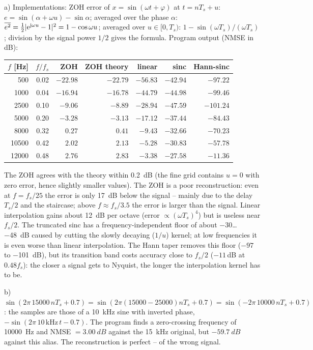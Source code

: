 \begin{solution}
a) Implementations:
ZOH error of $x=\sin(\omega t+\varphi)$ at $t=nT_s+u$:
$e=\sin(\alpha+\omega u)-\sin\alpha$; averaged over the phase
$\alpha$: $\overline{e^2}=\tfrac12|\mathrm{e}^{\mathrm{j}\omega u}-1|^2=1-\cos\omega u$;
averaged over $u\in[0,T_s)$: $1-\sin(\omega T_s)/(\omega T_s)$; division by the
signal power $1/2$ gives the formula. Program output (NMSE in dB):
\begin{center}\small
\begin{tabular}{@{}rrrrrrr@{}}\toprule
$f$ [Hz] & $f/f_s$ & ZOH & ZOH theory & linear & sinc & Hann-sinc\\\midrule
500   & 0.02 & $-22.98$ & $-22.79$ & $-56.83$ & $-42.94$ & $-97.22$\\
1000  & 0.04 & $-16.94$ & $-16.78$ & $-44.79$ & $-44.98$ & $-99.46$\\
2500  & 0.10 & $-9.06$  & $-8.89$  & $-28.94$ & $-47.59$ & $-101.24$\\
5000  & 0.20 & $-3.28$  & $-3.13$  & $-17.12$ & $-37.44$ & $-84.43$\\
8000  & 0.32 & $0.27$   & $0.41$   & $-9.43$  & $-32.66$ & $-70.23$\\
10500 & 0.42 & $2.02$   & $2.13$   & $-5.28$  & $-30.83$ & $-57.78$\\
12000 & 0.48 & $2.76$   & $2.83$   & $-3.38$  & $-27.58$ & $-11.36$\\\bottomrule
\end{tabular}
\end{center}
The ZOH agrees with the theory within \SI{0.2}{dB} (the fine grid contains
$u=0$ with zero error, hence slightly smaller values). The ZOH is a poor
reconstruction: even at $f=f_s/25$ the error is only \SI{17}{dB} below the
signal -- mainly due to the delay $T_s/2$ and the staircase; above
$f\approx f_s/3.5$ the error is larger than the signal. Linear interpolation
gains about \SI{12}{dB} per octave (error $\propto(\omega T_s)^4$) but is
useless near $f_s/2$. The truncated sinc has a frequency-independent floor of
about \SI{-30}{}\dots\SI{-48}{dB} caused by cutting the slowly decaying ($1/u$) kernel;
at low frequencies it is even worse than linear interpolation. The Hann taper
removes this floor ($-97$ to \SI{-101}{dB}), but its transition band costs
accuracy close to $f_s/2$ ($-11$\,dB at $0.48f_s$): the closer a signal
gets to Nyquist, the longer the interpolation kernel has to be.

b) $\sin(2\pi\,15000\,nT_s+0.7)=\sin(2\pi(15000-25000)nT_s+0.7)
=\sin(-2\pi\,10000\,nT_s+0.7)$: the samples are those of a \SI{10}{kHz} sine
with inverted phase, $-\sin(2\pi\,10\,\text{kHz}\,t-0.7)$. The program finds
a zero-crossing frequency of \SI{10000}{Hz} and NMSE $=\SI{3.00}{dB}$ against
the \SI{15}{kHz} original, but $\SI{-59.7}{dB}$ against this alias. The
reconstruction is perfect -- of the wrong signal.


\end{solution}
